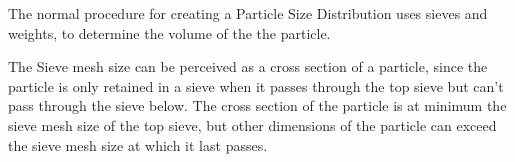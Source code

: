 
The normal procedure for creating a Particle Size Distribution uses sieves and weights, to determine the volume of the the particle.

The Sieve mesh size can be perceived as a cross section of a particle, since the particle is only retained in a sieve when it passes through the top sieve but can't pass through the sieve below. The cross section of the particle is at minimum the sieve mesh size of the top sieve, but other dimensions of the particle can exceed the sieve mesh size at which it last passes.
